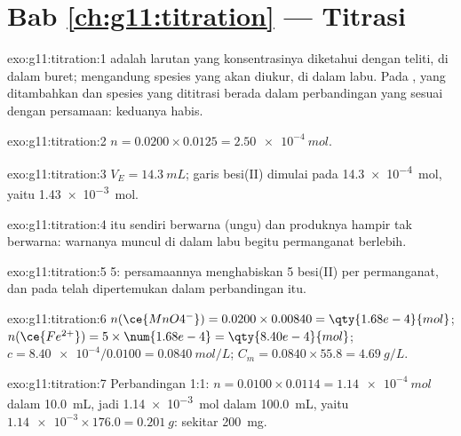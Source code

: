 \section*{Bab \ref{ch:g11:titration} --- Titrasi}

\begin{solution}{exo:g11:titration:1}
 adalah larutan yang konsentrasinya diketahui dengan teliti, di
dalam buret;  mengandung spesies yang akan diukur,
di dalam labu. Pada ,  yang ditambahkan dan spesies
yang dititrasi berada dalam perbandingan yang sesuai dengan persamaan:
keduanya habis.
\end{solution}

\begin{solution}{exo:g11:titration:2}
$n = 0.0200 \times 0.0125 = \qty{2.50e-4}{mol}$.
\end{solution}

\begin{solution}{exo:g11:titration:3}
$V_E = \qty{14.3}{mL}$; garis besi(II) dimulai pada
\qty{14.3e-4}{mol}, yaitu \qty{1.43e-3}{mol}.
\end{solution}

\begin{solution}{exo:g11:titration:4}
 itu sendiri berwarna (ungu) dan produknya hampir tak berwarna:
warnanya muncul di dalam labu begitu permanganat berlebih.
\end{solution}

\begin{solution}{exo:g11:titration:5}
5: persamaannya menghabiskan 5  besi(II) per  permanganat, dan
pada   telah dipertemukan dalam
perbandingan itu.
\end{solution}

\begin{solution}{exo:g11:titration:6}
$n(\ce{MnO4^-}) = 0.0200 \times 0.00840 = \qty{1.68e-4}{mol}$;
$n(\ce{Fe^{2+}}) = 5 \times \num{1.68e-4} = \qty{8.40e-4}{mol}$;
$c = \num{8.40e-4} / 0.0100 = \qty{0.0840}{mol/L}$;
$C_m = 0.0840 \times 55.8 = \qty{4.69}{g/L}$.
\end{solution}

\begin{solution}{exo:g11:titration:7}
Perbandingan 1:1: $n = 0.0100 \times 0.0114 = \qty{1.14e-4}{mol}$ dalam
\qty{10.0}{mL}, jadi \qty{1.14e-3}{mol} dalam \qty{100.0}{mL}, yaitu
$\num{1.14e-3} \times 176.0 = \qty{0.201}{g}$: sekitar \qty{200}{mg}.
\end{solution}

